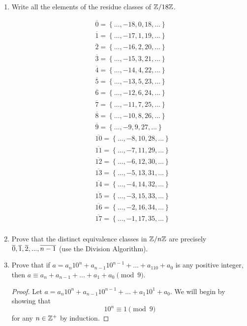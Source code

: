 \begin{enumerate}
	\item Write all the elements of the residue classes of $\mathbb{Z}/18\mathbb{Z}$.
	\begin{sln}
		\begin{align*}
			& \overline{0} = \left\{ ...,-18,0, 18,... \right\}\\
			& \overline{1} = \left\{  ...,-17, 1, 19,...\right\}\\
			& \overline{2} = \left\{ ..., -16, 2, 20,... \right\}\\
			& \overline{3} = \left\{ ..., -15 ,3 , 21,... \right\}\\
			& \overline{4} = \left\{ ..., -14, 4, 22,... \right\}\\
			& \overline{5} = \left\{ ..., -13, 5, 23,... \right\}\\
			& \overline{6} = \left\{ ..., -12, 6, 24,... \right\}\\
			& \overline{7} = \left\{ ..., -11, 7, 25,... \right\}\\
			& \overline{8} = \left\{ ..., -10, 8, 26,... \right\}\\
			& \overline{9} = \left\{ ..., -9, 9, 27,... \right\}\\
			& \overline{10}=\left\{..., -8, 10, 28,...\right\}\\
			& \overline{11}=\left\{..., -7, 11, 29,...\right\}\\
			& \overline{12}=\left\{..., -6, 12, 30,...\right\}\\
			& \overline{13}=\left\{..., -5, 13, 31,...\right\}\\
			& \overline{14}=\left\{..., -4, 14, 32,...\right\}\\
			& \overline{15}=\left\{..., -3, 15, 33,...\right\}\\
			& \overline{16}=\left\{..., -2, 16, 34,...\right\}\\
			& \overline{17}=\left\{..., -1, 17, 35,...\right\}\\
		\end{align*}
	\end{sln}
	\item Prove that the distinct equivalence classes in $\mathbb{Z}/n\mathbb{Z}$ are precisely $\overline{0}, \overline{1},\overline{2}, ..., \overline{n-1}$ (use the Division Algorithm).
	
	\item Prove that if $a = a_n10^n+a_{n-1}10^{n-1}+...+a_110+a_0$ is any positive integer, then $a\equiv a_n+a_{n-1}+...+a_1+a_0 \pmod 9$.
	\begin{proof}
		Let $a = a_n10^n+a_{n-1}10^{n-1} + ... + a_1 10^1 + a_0$.  
		We will begin by showing that $$10^n \equiv 1 \pmod 9$$ for any $n\in\mathbb{Z}^+$ by induction.
		

\end{proof}
\end{enumerate}
